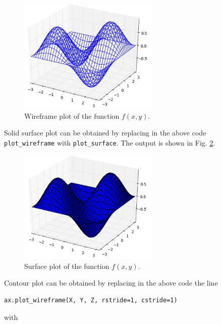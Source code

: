 \begin{figure}[!ht]
\begin{center}
\includegraphics[width=0.6\textwidth]{imgp/plot3d-2.png}
\end{center}
\vspace{-4mm}
\caption{Wireframe plot of the function $f(x, y)$.}
\label{fig:plot3d-2}
\end{figure}
\noindent
Solid surface plot can be obtained by replacing in the above code 
{\tt plot\_wireframe} with {\tt plot\_surface}. 
The output is shown in Fig. \ref{fig:plot3d-3}.

\begin{figure}[!ht]
\begin{center}
\includegraphics[width=0.6\textwidth]{imgp/plot3d-3.png}
\end{center}
\vspace{-4mm}
\caption{Surface plot of the function $f(x, y)$.}
\label{fig:plot3d-3}
\end{figure}
\newpage

\noindent
Contour plot can be obtained by replacing in the above code 
the line 

\begin{verbatim}
ax.plot_wireframe(X, Y, Z, rstride=1, cstride=1)
\end{verbatim}
with 


